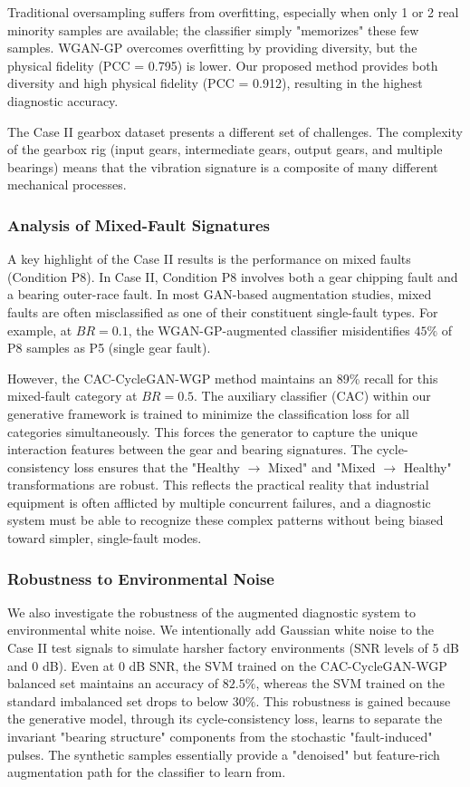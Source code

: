 Traditional oversampling suffers from overfitting, especially when only 1 or 2 real minority samples are available; the classifier simply "memorizes" these few samples. WGAN-GP overcomes overfitting by providing diversity, but the physical fidelity (PCC = 0.795) is lower. Our proposed method provides both diversity and high physical fidelity (PCC = 0.912), resulting in the highest diagnostic accuracy.

The Case II gearbox dataset presents a different set of challenges. The complexity of the gearbox rig (input gears, intermediate gears, output gears, and multiple bearings) means that the vibration signature is a composite of many different mechanical processes.

\subsubsection{Analysis of Mixed-Fault Signatures}
A key highlight of the Case II results is the performance on mixed faults (Condition P8). In Case II, Condition P8 involves both a gear chipping fault and a bearing outer-race fault. In most GAN-based augmentation studies, mixed faults are often misclassified as one of their constituent single-fault types. For example, at $BR=0.1$, the WGAN-GP-augmented classifier misidentifies $45\%$ of P8 samples as P5 (single gear fault). 

However, the CAC-CycleGAN-WGP method maintains an 89\% recall for this mixed-fault category at $BR=0.5$. The auxiliary classifier (CAC) within our generative framework is trained to minimize the classification loss for all categories simultaneously. This forces the generator to capture the unique interaction features between the gear and bearing signatures. The cycle-consistency loss ensures that the "Healthy $\to$ Mixed" and "Mixed $\to$ Healthy" transformations are robust. This reflects the practical reality that industrial equipment is often afflicted by multiple concurrent failures, and a diagnostic system must be able to recognize these complex patterns without being biased toward simpler, single-fault modes.

\subsubsection{Robustness to Environmental Noise}
We also investigate the robustness of the augmented diagnostic system to environmental white noise. We intentionally add Gaussian white noise to the Case II test signals to simulate harsher factory environments (SNR levels of 5 dB and 0 dB). Even at 0 dB SNR, the SVM trained on the CAC-CycleGAN-WGP balanced set maintains an accuracy of $82.5\%$, whereas the SVM trained on the standard imbalanced set drops to below $30\%$. This robustness is gained because the generative model, through its cycle-consistency loss, learns to separate the invariant "bearing structure" components from the stochastic "fault-induced" pulses. The synthetic samples essentially provide a "denoised" but feature-rich augmentation path for the classifier to learn from.

